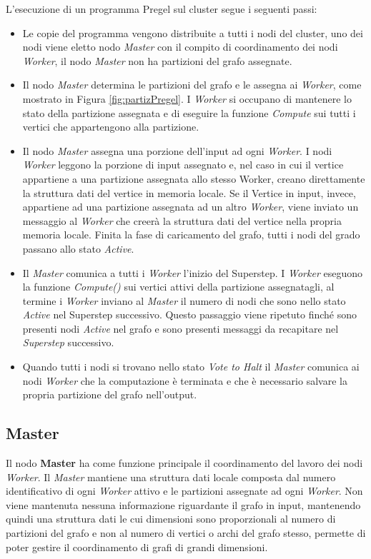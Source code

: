 \documentclass[LaM,binding=0.6cm]{sapthesis}
\begin{document}
L'esecuzione di un programma Pregel sul cluster segue i seguenti passi:
\begin{itemize}
\item Le copie del programma vengono distribuite a tutti i nodi del cluster, uno dei nodi viene eletto nodo \textit{Master} con il compito di coordinamento dei nodi \textit{Worker}, il nodo \textit{Master }non ha partizioni del grafo assegnate.
\item Il nodo \textit{Master} determina le partizioni del grafo e le assegna ai \textit{Worker}, come  mostrato in Figura \ref{fig:partizPregel}. I \textit{Worker} si occupano di mantenere lo stato della partizione assegnata e di eseguire la funzione \textit{Compute} sui tutti i vertici che appartengono alla partizione. 
\item Il nodo \textit{Master} assegna una porzione dell’input ad ogni \textit{Worker}. I nodi \textit{Worker} leggono la porzione di input assegnato e, nel caso in cui il vertice appartiene a una partizione assegnata allo stesso Worker, creano direttamente la struttura dati del vertice in memoria locale. Se il Vertice in input, invece, appartiene ad una partizione assegnata ad un altro \textit{Worker}, viene inviato un messaggio al \textit{Worker} che creerà la struttura dati del vertice nella propria memoria locale. Finita la fase di caricamento del grafo, tutti i nodi del grado passano allo stato \textit{Active}.
\item Il \textit{Master} comunica a tutti i \textit{Worker} l'inizio del Superstep. I \textit{Worker} eseguono la funzione \textit{Compute()} sui vertici attivi della  partizione assegnatagli, al termine i \textit{Worker} inviano al \textit{Master} il numero di nodi che sono nello stato \textit{Active} nel Superstep successivo. Questo passaggio viene ripetuto finché sono presenti nodi \textit{Active} nel grafo e sono presenti messaggi da recapitare nel \textit{Superstep} successivo.
\item Quando tutti i nodi si trovano nello stato \textit{Vote to Halt} il \textit{Master} comunica ai nodi \textit{Worker} che la computazione è terminata e che è necessario salvare la propria partizione del grafo nell'output.
\end{itemize}

\subsection{Master}

Il nodo \textbf{Master} ha come funzione principale il coordinamento del lavoro dei nodi \textit{Worker}. Il \textit{Master} mantiene una struttura dati locale composta dal numero identificativo di ogni \textit{Worker} attivo e le partizioni assegnate ad ogni \textit{Worker}. 
Non viene mantenuta nessuna informazione riguardante il grafo in input, mantenendo quindi una struttura dati le cui dimensioni sono proporzionali al numero di partizioni del grafo e non al numero di vertici o archi del grafo stesso, permette di poter gestire il coordinamento di grafi di grandi dimensioni.
\end{document}
